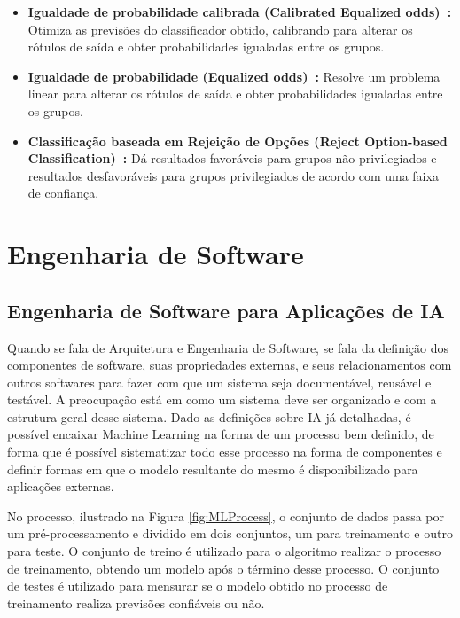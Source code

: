 \documentclass[portugues]{ic-tese}
\begin{document}
\begin{itemize}
\item \textbf{Igualdade de probabilidade calibrada (Calibrated Equalized odds)~\citep{Pleiss_2017}:} Otimiza as previsões do classificador obtido, calibrando para alterar os rótulos de saída e obter probabilidades igualadas entre os grupos.

\item \textbf{Igualdade de probabilidade (Equalized odds)~\citep{Hardt_2016}:} Resolve um problema linear para alterar os rótulos de saída e obter probabilidades igualadas entre os grupos.

\item \textbf{Classificação baseada em Rejeição de Opções (Reject Option-based Classification)~\citep{Kamiran_2012}:} Dá resultados favoráveis para grupos não privilegiados e resultados desfavoráveis para grupos privilegiados de acordo com uma faixa de confiança.

\end{itemize}

\section{Engenharia de Software}

\subsection{Engenharia de Software para Aplicações de IA}

Quando se fala de Arquitetura e Engenharia de Software, se fala da definição dos componentes de software, suas propriedades externas, e seus relacionamentos com outros softwares para fazer com que um sistema seja documentável, reusável e testável. A preocupação está em como um sistema deve ser organizado e com a estrutura geral desse sistema. Dado as definições sobre IA já detalhadas, é possível encaixar Machine Learning na forma de um processo bem definido, de forma que é possível sistematizar todo esse processo na forma de componentes e definir formas em que o modelo resultante do mesmo é disponibilizado para aplicações externas.

No processo, ilustrado na Figura \ref{fig:MLProcess}, o conjunto de dados passa por um pré-processamento e dividido em dois conjuntos, um para treinamento e outro para teste. O conjunto de treino é utilizado para o algoritmo realizar o processo de treinamento, obtendo um modelo após o término desse processo. O conjunto de testes é utilizado para mensurar se o modelo obtido no processo de treinamento realiza previsões confiáveis ou não.
\end{document}
